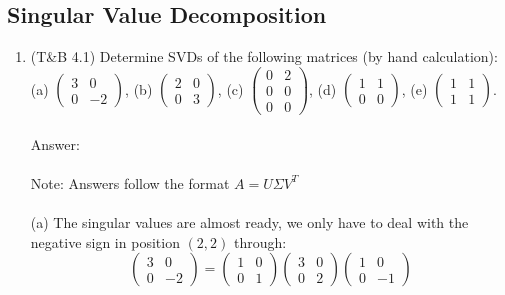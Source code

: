 \documentclass{article}
\begin{document}
\subsection*{Singular Value Decomposition}
\begin{enumerate}
\setcounter{enumi}{0}
\item (T\&B 4.1) Determine SVDs of the following matrices (by hand calculation):\\
(a) $\left( \begin{array}{cc} 3 & 0 \\ 0 & -2  \end{array} \right)$, \quad
(b) $\left( \begin{array}{cc} 2 & 0 \\ 0 &  3  \end{array} \right)$, \quad 
(c) $\left( \begin{array}{cc} 0 & 2 \\ 0 & 0 \\ 0 & 0  \end{array} \right)$,  \quad
(d) $\left( \begin{array}{cc} 1 & 1 \\ 0 & 0  \end{array} \right)$,  \quad
(e) $\left( \begin{array}{cc} 1 & 1 \\ 1 & 1  \end{array} \right)$.\\
\\
Answer:\\
\\
Note: Answers follow the format $A=U \Sigma V^T$ \\
\\
(a) The singular values are almost ready, we only have to deal with the negative sign in position $(2,2)$ through:
$$\left( \begin{array}{cc} 3 & 0 \\ 0 & -2  \end{array} \right) = 
\left( \begin{array}{cc} 1 & 0 \\ 0 & 1  \end{array} \right)
\left( \begin{array}{cc} 3 & 0 \\ 0 & 2  \end{array} \right)
\left( \begin{array}{cc} 1 & 0 \\ 0 & -1  \end{array} \right)$$

\end{enumerate}
\end{document}
